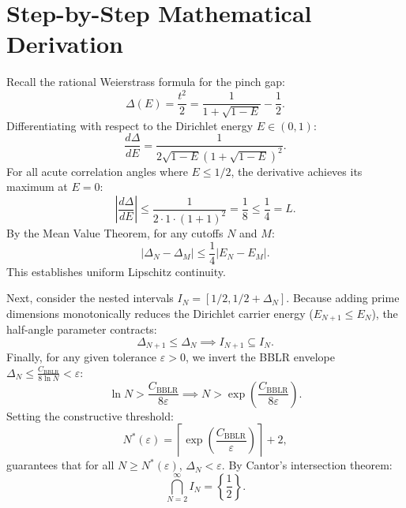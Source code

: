 \documentclass[11pt,a4paper]{article}
\theoremstyle{definition}
\begin{document}
\section{Step-by-Step Mathematical Derivation}

Recall the rational Weierstrass formula for the pinch gap:
\begin{equation}
\Delta(E) = \frac{t^2}{2} = \frac{1}{1 + \sqrt{1 - E}} - \frac{1}{2}.
\end{equation}
Differentiating with respect to the Dirichlet energy $E \in (0, 1)$:
\begin{equation}
\frac{d\Delta}{dE} = \frac{1}{2 \sqrt{1 - E} (1 + \sqrt{1 - E})^2}.
\end{equation}
For all acute correlation angles where $E \le 1/2$, the derivative achieves its maximum at $E = 0$:
\begin{equation}
\left|\frac{d\Delta}{dE}\right| \le \frac{1}{2 \cdot 1 \cdot (1 + 1)^2} = \frac{1}{8} \le \frac{1}{4} = L.
\end{equation}
By the Mean Value Theorem, for any cutoffs $N$ and $M$:
\begin{equation}
|\Delta_N - \Delta_M| \le \frac{1}{4} |E_N - E_M|.
\end{equation}
This establishes uniform Lipschitz continuity.

Next, consider the nested intervals $I_N = [1/2, 1/2 + \Delta_N]$. Because adding prime dimensions monotonically reduces the Dirichlet carrier energy ($E_{N+1} \le E_N$), the half-angle parameter contracts:
\begin{equation}
\Delta_{N+1} \le \Delta_N \implies I_{N+1} \subseteq I_N.
\end{equation}
Finally, for any given tolerance $\varepsilon > 0$, we invert the BBLR envelope $\Delta_N \le \frac{C_{\mathrm{BBLR}}}{8 \ln N} < \varepsilon$:
\begin{equation}
\ln N > \frac{C_{\mathrm{BBLR}}}{8 \varepsilon} \implies N > \exp\left(\frac{C_{\mathrm{BBLR}}}{8 \varepsilon}\right).
\end{equation}
Setting the constructive threshold:
\begin{equation}
N^*(\varepsilon) = \left\lceil \exp\left(\frac{C_{\mathrm{BBLR}}}{\varepsilon}\right) \right\rceil + 2,
\end{equation}
guarantees that for all $N \ge N^*(\varepsilon)$, $\Delta_N < \varepsilon$. By Cantor's intersection theorem:
\begin{equation}
\bigcap_{N=2}^\infty I_N = \left\{\frac{1}{2}\right\}.
\end{equation}
\end{document}

